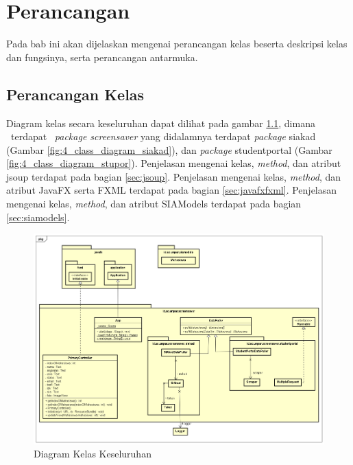 \chapter{Perancangan}
\label{chap:perancangan}

Pada bab ini akan dijelaskan mengenai perancangan kelas beserta deskripsi kelas dan fungsinya, serta perancangan antarmuka.

\section{Perancangan Kelas}
\label{perancanganKelas}

Diagram kelas secara keseluruhan dapat dilihat pada gambar \ref{fig:4_class_diagram}, dimana ~terdapat ~\textit{package screensaver} yang didalamnya terdapat \textit{package} siakad (Gambar \ref{fig:4_class_diagram_siakad}), dan \textit{package} studentportal (Gambar \ref{fig:4_class_diagram_stupor}).
Penjelasan mengenai kelas, \textit{method}, dan atribut jsoup terdapat pada bagian \ref{sec:jsoup}.
Penjelasan mengenai kelas, \textit{method}, dan atribut JavaFX serta FXML terdapat pada bagian \ref{sec:javafxfxml}. Penjelasan mengenai kelas, \textit{method}, dan atribut SIAModels terdapat pada bagian \ref{sec:siamodels}. 

\begin{figure}[h]
	\centering
	\includegraphics[scale=0.39]{Gambar/ClassDiagram.png}
	\caption{Diagram Kelas Keseluruhan}
	\label{fig:4_class_diagram}
\end{figure}

